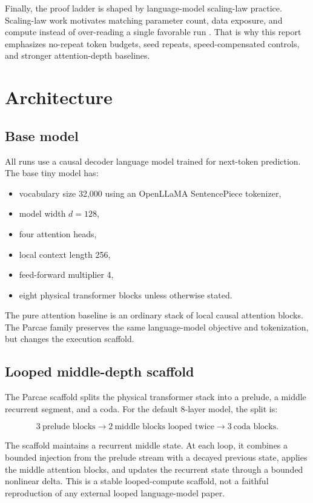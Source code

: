 \documentclass[11pt]{article}
\newcommand{\parcae}{Parcae}
\begin{document}
Finally, the proof ladder is shaped by language-model scaling-law practice.
Scaling-law work motivates matching parameter count, data exposure, and compute
instead of over-reading a single favorable run \cite{kaplan2020scaling,
hoffmann2022training}. That is why this report emphasizes no-repeat token
budgets, seed repeats, speed-compensated controls, and stronger attention-depth
baselines.

\section{Architecture}

\subsection{Base model}

All runs use a causal decoder language model trained for next-token prediction.
The base tiny model has:

\begin{itemize}
  \item vocabulary size 32,000 using an OpenLLaMA SentencePiece tokenizer,
  \item model width $d=128$,
  \item four attention heads,
  \item local context length 256,
  \item feed-forward multiplier 4,
  \item eight physical transformer blocks unless otherwise stated.
\end{itemize}

The pure attention baseline is an ordinary stack of local causal attention
blocks. The \parcae{} family preserves the same language-model objective and
tokenization, but changes the execution scaffold.

\subsection{Looped middle-depth scaffold}

The \parcae{} scaffold splits the physical transformer stack into a prelude, a
middle recurrent segment, and a coda. For the default 8-layer model, the split
is:

\[
  3\ \text{prelude blocks}
  \rightarrow
  2\ \text{middle blocks looped twice}
  \rightarrow
  3\ \text{coda blocks}.
\]

The scaffold maintains a recurrent middle state. At each loop, it combines a
bounded injection from the prelude stream with a decayed previous state, applies
the middle attention blocks, and updates the recurrent state through a bounded
nonlinear delta. This is a stable looped-compute scaffold, not a faithful
reproduction of any external looped language-model paper.
\end{document}

